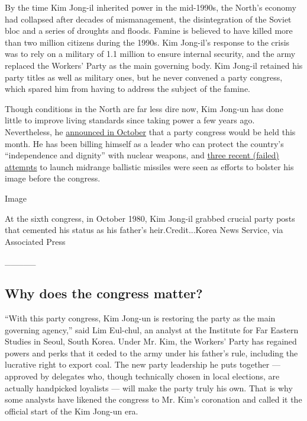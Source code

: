 By the time Kim Jong-il inherited power in the mid-1990s, the North's
economy had collapsed after decades of mismanagement, the disintegration
of the Soviet bloc and a series of droughts and floods. Famine is
believed to have killed more than two million citizens during the 1990s.
Kim Jong-il's response to the crisis was to rely on a military of 1.1
million to ensure internal security, and the army replaced the Workers'
Party as the main governing body. Kim Jong-il retained his party titles
as well as military ones, but he never convened a party congress, which
spared him from having to address the subject of the famine.

Though conditions in the North are far less dire now, Kim Jong-un has
done little to improve living standards since taking power a few years
ago. Nevertheless, he
\href{http://www.nytimes3xbfgragh.onion/2015/10/31/world/asia/north-korea-to-hold-convention-for-workers-party.html}{announced
in October} that a party congress would be held this month. He has been
billing himself as a leader who can protect the country's ``independence
and dignity'' with nuclear weapons, and
\href{http://www.nytimes3xbfgragh.onion/2016/04/29/world/asia/north-korea-missile-test.html}{three
recent (failed) attempts} to launch midrange ballistic missiles were
seen as efforts to bolster his image before the congress.

Image

At the sixth congress, in October 1980, Kim Jong-il grabbed crucial
party posts that cemented his status as his father's heir.Credit...Korea
News Service, via Associated Press

\_\_\_\_\_

\hypertarget{why-does-the-congress-matter}{%
\subsection{Why does the congress
matter?}\label{why-does-the-congress-matter}}

``With this party congress, Kim Jong-un is restoring the party as the
main governing agency,'' said Lim Eul-chul, an analyst at the Institute
for Far Eastern Studies in Seoul, South Korea. Under Mr. Kim, the
Workers' Party has regained powers and perks that it ceded to the army
under his father's rule, including the lucrative right to export coal.
The new party leadership he puts together --- approved by delegates who,
though technically chosen in local elections, are actually handpicked
loyalists --- will make the party truly his own. That is why some
analysts have likened the congress to Mr. Kim's coronation and called it
the official start of the Kim Jong-un era.


